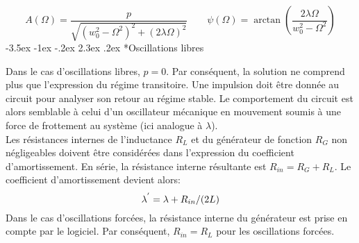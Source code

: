 \documentclass[a4paper, 12pt,oneside]{article}
\makeatletter
\renewcommand{\subsection}{\@startsection {subsection}{1}{\z@}%
             {-3.5ex \@plus -1ex \@minus -.2ex}%
             {2.3ex \@plus.2ex}%
             {\normalfont\normalsize\bfseries}}
\makeatother
\begin{document}
\begin{equation}
A(\Omega)= \frac{p}{\sqrt{(w_0^2-\Omega^2)^2+(2\lambda\Omega)^2}} \qquad \psi(\Omega)=\arctan\left(\frac{2\lambda\Omega}{w_0^2-\Omega^2}\right)
\end{equation}
\vspace{-0.4cm}
\subsection*{Oscillations libres}

Dans le cas d'oscillations libres, $p=0$. Par conséquent, la solution ne comprend plus que l'expression du régime transitoire. Une impulsion doit être donnée au circuit pour analyser son retour au régime stable. Le comportement du circuit est alors semblable à celui d'un oscillateur mécanique en mouvement soumis à une force de frottement au système (ici analogue à $\lambda$).\\
Les résistances internes de l'inductance $R_L$ et du générateur de fonction $R_G$ non négligeables doivent être considérées dans l'expression du coefficient d'amortissement. En série, la résistance interne résultante est $R_{in}=R_G+R_L$. Le coefficient d'amortissement devient alors:
\vspace{-0.1cm}
\begin{equation}
    \lambda^{'} = \lambda+R_{in}/(2L)
    \label{eq'}
    \vspace{-0.1cm}
\end{equation}
Dans le cas d'oscillations forcées, la résistance interne du générateur est prise en compte par le logiciel. Par conséquent, $R_{in} = R_L$ pour les oscillations forcées.
\vspace{-0.2cm}
\end{document}

